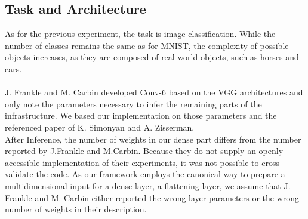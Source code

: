 \subsection*{Task and Architecture}
As for the previous experiment, the task is image classification. While the number of classes remains the same as for MNIST, the complexity of possible objects increases, as they are composed of real-world objects, such as horses and cars.\\
\\
J. Frankle and M. Carbin developed Conv-6 based on the VGG architectures and only note the parameters necessary to infer the remaining parts of the infrastructure.\cite{LTH} We based our implementation on those parameters and the referenced paper of K. Simonyan and A. Zisserman.\cite{VGG}\\
After Inference, the number of weights in our dense part differs from the number reported by J.Frankle and M.Carbin. Because they do not supply an openly accessible implementation of their experiments, it was not possible to cross-validate the code.
As our framework employs the canonical way to prepare a multidimensional input for a dense layer, a flattening layer, we assume that J. Frankle and M. Carbin either reported the wrong layer parameters or the wrong number of weights in their description.
\newpage 
